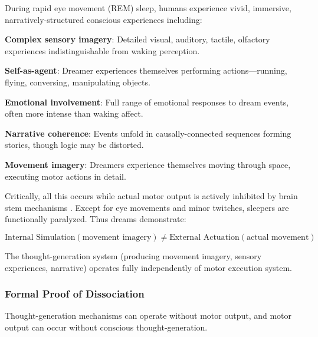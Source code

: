 \documentclass[11pt,onecolumn]{article}
\begin{document}
During rapid eye movement (REM) sleep, humans experience vivid, immersive, narratively-structured conscious experiences \citep{hobson2009rem} including:

\textbf{Complex sensory imagery}: Detailed visual, auditory, tactile, olfactory experiences indistinguishable from waking perception.

\textbf{Self-as-agent}: Dreamer experiences themselves performing actions---running, flying, conversing, manipulating objects.

\textbf{Emotional involvement}: Full range of emotional responses to dream events, often more intense than waking affect.

\textbf{Narrative coherence}: Events unfold in causally-connected sequences forming stories, though logic may be distorted.

\textbf{Movement imagery}: Dreamers experience themselves moving through space, executing motor actions in detail.

Critically, all this occurs while actual motor output is actively inhibited by brain stem mechanisms \citep{chase2008control}. Except for eye movements and minor twitches, sleepers are functionally paralyzed. Thus dreams demonstrate:

\begin{equation}
\text{Internal Simulation}(\text{movement imagery}) \neq \text{External Actuation}(\text{actual movement})
\end{equation}

The thought-generation system (producing movement imagery, sensory experiences, narrative) operates fully independently of motor execution system.

\subsubsection{Formal Proof of Dissociation}

\begin{theorem}
\label{thm:dissociation}
Thought-generation mechanisms can operate without motor output, and motor output can occur without conscious thought-generation.
\end{theorem}
\end{document}
